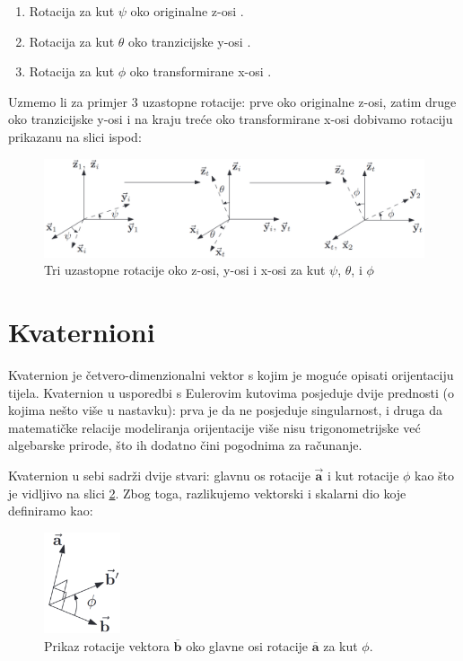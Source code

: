 \documentclass[times, utf8, diplomski, numeric]{templates/template}
\begin{document}
{{        \begin{enumerate}
            \item Rotacija za kut $\psi$ oko originalne z-osi .
            \item Rotacija za kut $\theta$ oko tranzicijske y-osi .
            \item Rotacija za kut $\phi$ oko transformirane x-osi .
        \end{enumerate}

        Uzmemo li za primjer 3 uzastopne rotacije: prve oko originalne z-osi, zatim druge oko tranzicijske y-osi i na kraju treće oko transformirane x-osi dobivamo rotaciju prikazanu na slici ispod: 

        \begin{figure}[htb]
        \centering
        \includegraphics[width=1.0\textwidth]{images/eulerovi_kutovi.jpg}
        \caption{Tri uzastopne rotacije oko z-osi, y-osi i x-osi za kut $\psi$, $\theta$, i $\phi$}
        \label{fig:euler_rotacija}
        \end{figure}
    }

    \section{Kvaternioni}{
        Kvaternion je četvero-dimenzionalni vektor s kojim je moguće opisati orijentaciju tijela. Kvaternion u usporedbi s Eulerovim kutovima posjeduje dvije prednosti (o kojima nešto više u nastavku): prva je da ne posjeduje singularnost, i druga da matematičke relacije modeliranja orijentacije više nisu trigonometrijske već algebarske prirode, što ih dodatno čini pogodnima za računanje.

        Kvaternion u sebi sadrži dvije stvari: glavnu os rotacije  $\overrightarrow{\boldsymbol{a}}$ i kut rotacije $\phi$ kao što je vidljivo na slici \ref{fig:principal_axis_rotation}. Zbog toga, razlikujemo vektorski i skalarni dio koje definiramo kao:

        \begin{figure}[htb]
        \centering
        \includegraphics[width=0.2\textwidth]{images/principal_axis_rotation.png}
        \caption{Prikaz rotacije vektora $\boldsymbol{\overline{b}}$ oko glavne osi rotacije $\boldsymbol{\overline{a}}$ za kut $\phi$.}
        \label{fig:principal_axis_rotation}
        \end{figure}

}}
\end{document}
